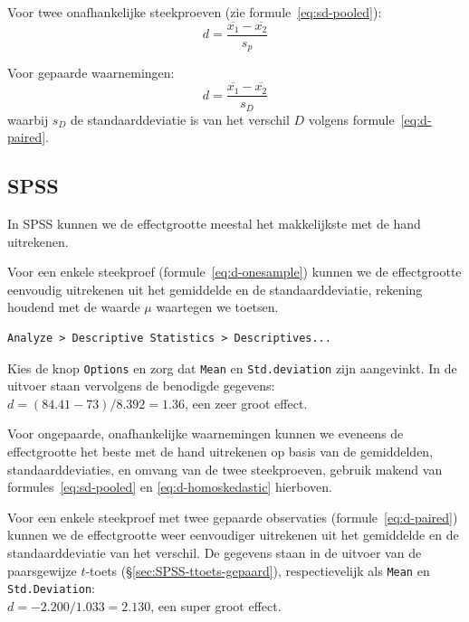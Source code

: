 \documentclass[
]{book}
\begin{document}
Voor twee onafhankelijke steekproeven (zie
formule~\eqref{eq:sd-pooled}):
\begin{equation}
  \label{eq:d-homoskedastic}
  d = \frac{ \overline{x_1}-\overline{x_2} } { s_p }
\end{equation}

Voor gepaarde waarnemingen:
\begin{equation}
  \label{eq:d-paired}
  d = \frac{ \overline{x_1}-\overline{x_2} } { s_D }
\end{equation}
waarbij \(s_D\) de
standaarddeviatie is van het verschil \(D\) volgens
formule~\eqref{eq:d-paired}.

\hypertarget{spss-13-2}{%
\subsection{SPSS}\label{spss-13-2}}

In SPSS kunnen we de effectgrootte meestal het makkelijkste met de hand
uitrekenen.

Voor een enkele steekproef
(formule~\eqref{eq:d-onesample}) kunnen we de effectgrootte eenvoudig
uitrekenen uit het gemiddelde en de standaarddeviatie, rekening houdend
met de waarde \(\mu\) waartegen we toetsen.

\begin{verbatim}
Analyze > Descriptive Statistics > Descriptives...
\end{verbatim}

Kies de knop \texttt{Options} en zorg dat \texttt{Mean} en \texttt{Std.deviation} zijn
aangevinkt. In de uitvoer staan vervolgens de benodigde gegevens:\\
\(d = (84.41 - 73) / 8.392 = 1.36\), een zeer groot effect.

Voor ongepaarde, onafhankelijke waarnemingen kunnen we eveneens de
effectgrootte het beste met de hand uitrekenen op basis van de
gemiddelden, standaarddeviaties, en omvang van de twee steekproeven,
gebruik makend van
formules~\eqref{eq:sd-pooled} en
\eqref{eq:d-homoskedastic} hierboven.

Voor een enkele steekproef met twee gepaarde observaties
(formule~\eqref{eq:d-paired}) kunnen we de effectgrootte weer eenvoudiger
uitrekenen uit het gemiddelde en de standaarddeviatie van het verschil.
De gegevens staan in de uitvoer van de paarsgewijze \(t\)-toets
(§\ref{sec:SPSS-ttoets-gepaard}), respectievelijk als \texttt{Mean} en
\texttt{Std.Deviation}:\\
\(d = -2.200 / 1.033 = 2.130\), een super groot effect.
\end{document}
